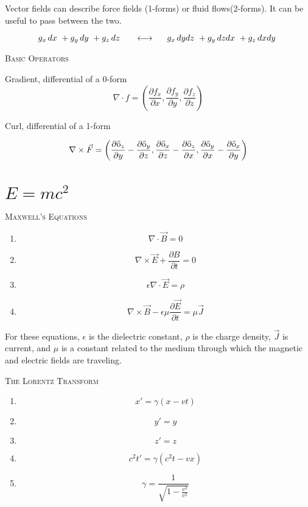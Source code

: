 \documentclass{article}
\begin{document}
\smallskip

Vector fields can describe force fields (1-forms) or fluid flows(2-forms).  It can be useful to pass between the two.

\[
g_x\,dx\ + g_y\,dy\ + g_z\,dz\ \hspace{5mm} \longleftrightarrow \hspace{5mm} g_x\,dydz\ + g_y\,dzdx\ + g_z\,dxdy\
\]

\bigskip

\textsc{Basic Operators}

Gradient, differential of a 0-form
\[
\nabla\cdot f = \left( \frac{\partial{f_x}}{\partial{x}}, \frac{\partial{f_y}}{\partial{y}}, \frac{\partial{f_z}}{\partial{z}} \right)
\]

\smallskip

Curl, differential of a 1-form

\[
\nabla \times \vec{F} = \left( \frac{\partial{\Bicycle_z}}{\partial{y}} - \frac{\partial{\Bicycle_y}}{\partial{z}}, \frac{\partial{\Bicycle_x}}{\partial{z}} - \frac{\partial{\Bicycle_z}}{\partial{x}}, \frac{\partial{\Bicycle_y}}{\partial{x}} - \frac{\partial{\Bicycle_x}}{\partial{y}} \right)
\]

\bigskip

\section{$E = mc^2$}

\textsc{Maxwell's Equations}

\begin{enumerate}
\item \[
\nabla \cdot \vec{B} = 0
\]
\item \[
\nabla \times \vec{E} + \frac{\partial{B}}{\partial{t}} = 0
\]
\item\[
\epsilon \nabla \cdot \vec{E} = \rho
\]
\item \[
\nabla \times \vec{B} - \epsilon \mu \frac{\partial{\vec{E}}}{\partial{t}} = \mu \vec{J}
\]
\end{enumerate}

For these equations, $\epsilon$ is the dielectric constant, $\rho$ is the charge density, $\vec{J}$ is current, and $\mu$ is a constant related to the medium through which the magnetic and electric fields are traveling.

\bigskip

\textsc{The Lorentz Transform}

\begin{enumerate}
\item \[
x' = \gamma (x - vt)
\]
\item \[
y' = y
\]
\item \[
z' = z
\]
\item \[
c^2t' = \gamma(c^2t - vx)
\]
\item\[
\gamma = \frac{1}{\sqrt{1 - \frac{v^2}{c^2}}}
\]
\end{enumerate}
\end{document}
